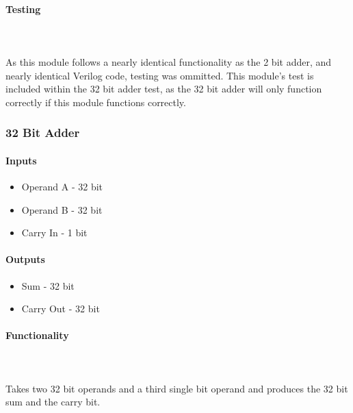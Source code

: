 \documentclass{article}
\begin{document}
    \paragraph{Testing}
    \hfill\\\\
    As this module follows a nearly identical functionality as the 2
    bit adder, and nearly identical Verilog code, testing was ommitted.
    This module's test is included within the 32 bit adder test, as the
    32 bit adder will only function correctly if this module functions
    correctly.




    \subsubsection{32 Bit Adder}

    \paragraph{Inputs}
    \begin{itemize}
        \item Operand A - 32 bit
        \item Operand B - 32 bit
        \item Carry In - 1 bit
    \end{itemize}

    \paragraph{Outputs}
    \begin{itemize}
        \item Sum - 32 bit
        \item Carry Out - 32 bit
    \end{itemize}

    \paragraph{Functionality}
    \hfill\\\\
    Takes two 32 bit operands and a third single bit operand and produces the
    32 bit sum and the carry bit.
\end{document}
